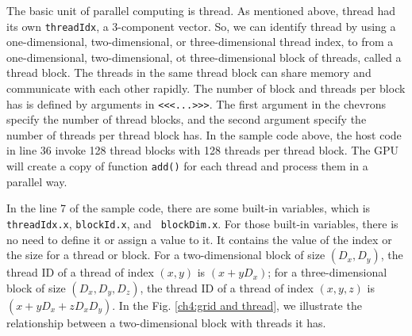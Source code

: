 The basic unit of parallel computing is thread. As mentioned above, thread had its own \lstinline|threadIdx|, a 3-component vector. So, we can identify thread by using a one-dimensional, two-dimensional, or three-dimensional thread index, to from a one-dimensional, two-dimensional, ot three-dimensional block of threads, called a thread block. The threads in the same thread block can share memory and communicate with each other rapidly. The number of block and threads per block has is defined by arguments in \lstinline|<<<...>>>|. The first argument in the chevrons specify the number of thread blocks, and the second argument specify the number of threads per thread block has. In the sample code above, the host code in line 36 invoke 128 thread blocks with 128 threads per thread block. The GPU will create a copy of function \lstinline|add()| for each thread and process them in a parallel way.

In the line 7 of the sample code, there are some built-in variables, which is \lstinline|threadIdx.x|, \lstinline|blockId.x|, and \lstinline| blockDim.x|. For those built-in variables, there is no need to define it or assign a value to it. It contains the value of the index or the size for a thread or block. For a two-dimensional block of size $(D_x, D_y)$, the thread ID of a thread of index $(x,y)$ is $(x+yD_x)$; for a three-dimensional block of size $(D_x,D_y,D_z)$, the thread ID of a thread of index $(x,y,z)$ is $(x+yD_x+zD_x D_y)$. In the Fig. \ref{ch4:grid and thread}, we illustrate the relationship between a two-dimensional block with threads it has.

